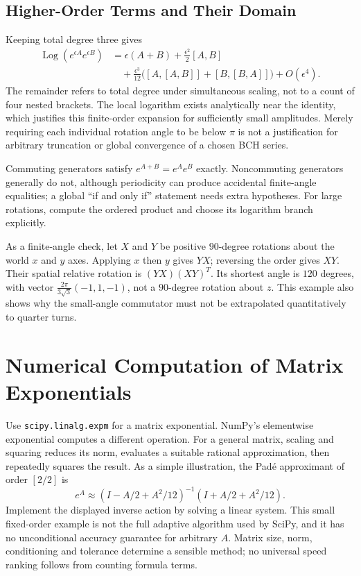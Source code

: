 \subsection{Higher-Order Terms and Their Domain}
\label{sec:bch_higher_order}

Keeping total degree three gives
\begin{equation}
 \begin{aligned}
 \operatorname{Log}(e^{\epsilon A}e^{\epsilon B})
 &=\epsilon(A+B)+\frac{\epsilon^2}{2}[A,B]\\
 &\quad+\frac{\epsilon^3}{12}
   \bigl([A,[A,B]]+[B,[B,A]]\bigr)+O(\epsilon^4).
 \end{aligned}
 \label{eq:bch_third_order}
\end{equation}
The remainder refers to total degree under simultaneous scaling, not to a count of four nested brackets. The local logarithm exists analytically near the identity, which justifies this finite-order expansion for sufficiently small amplitudes. Merely requiring each individual rotation angle to be below $\pi$ is not a justification for arbitrary truncation or global convergence of a chosen BCH series.

Commuting generators satisfy $e^{A+B}=e^Ae^B$ exactly. Noncommuting generators generally do not, although periodicity can produce accidental finite-angle equalities; a global ``if and only if'' statement needs extra hypotheses. For large rotations, compute the ordered product and choose its logarithm branch explicitly.

As a finite-angle check, let $X$ and $Y$ be positive $90$-degree rotations about the world $x$ and $y$ axes. Applying $x$ then $y$ gives $YX$; reversing the order gives $XY$. Their spatial relative rotation is $(YX)(XY)^T$. Its shortest angle is $120$ degrees, with vector $\frac{2\pi}{3\sqrt3}(-1,1,-1)$, not a $90$-degree rotation about $z$. This example also shows why the small-angle commutator must not be extrapolated quantitatively to quarter turns.

\section{Numerical Computation of Matrix Exponentials}
\label{sec:numerical_exp}

Use \texttt{scipy.linalg.expm} for a matrix exponential. NumPy's elementwise exponential computes a different operation. For a general matrix, scaling and squaring reduces its norm, evaluates a suitable rational approximation, then repeatedly squares the result. As a simple illustration, the Pad\'e approximant of order $[2/2]$ is
\begin{equation}
 e^A\approx
 (I-A/2+A^2/12)^{-1}(I+A/2+A^2/12).
 \label{eq:exponential_pade}
\end{equation}
Implement the displayed inverse action by solving a linear system. This small fixed-order example is not the full adaptive algorithm used by SciPy, and it has no unconditional accuracy guarantee for arbitrary $A$. Matrix size, norm, conditioning and tolerance determine a sensible method; no universal speed ranking follows from counting formula terms.

